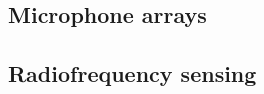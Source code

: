 \cite{ochiai2013reflective}

\cite{watanabe2013ultrasound}

\cite{priyantha2000cricket}
\subsection{Microphone arrays}
\cite{corbishley2008breathing}

\cite{zhang2008maximum}

\cite{xu2013crowd++}

\cite{harrison2011tapsense}

\subsection{Radiofrequency sensing}
\cite{adib20133d}

\cite{wilson2010radio}

\cite{sugano2006indoor}

\cite{pu2013whole}

